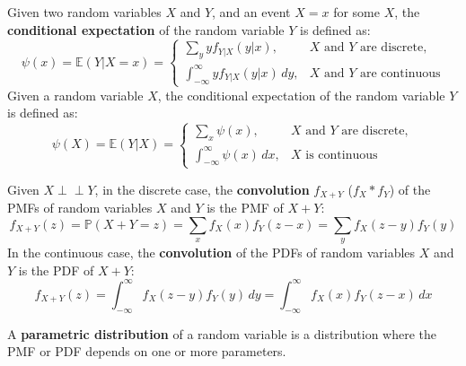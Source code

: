 \documentclass{huhtakm-template-book-v2}
\newcommand{\independent}{\perp\!\!\!\perp}
\newcommand{\prob}{\mathbb{P}}
\newcommand{\expect}{\mathbb{E}}
\begin{document}
    \begin{sdefn}
        Given two random variables $X$ and $Y$, and an event $X = x$ for some $X$, the \textbf{conditional expectation} of the random variable $Y$ is defined as:
        \begin{equation*}
            \psi(x) = \expect(Y | X = x) = \begin{cases}
                \sum_{y}yf_{Y|X}(y|x), & X \text{ and } Y \text{ are discrete},\\
                \int_{-\infty}^{\infty} yf_{Y|X}(y|x)\,dy, & X \text{ and } Y \text{ are continuous}
            \end{cases}
        \end{equation*}
        Given a random variable $X$, the conditional expectation of the random variable $Y$ is defined as:
        \begin{equation*}
            \psi(X) = \expect(Y | X) = \begin{cases}
                \sum_{x}\psi(x), & X \text{ and } Y \text{ are discrete},\\
                \int_{-\infty}^{\infty}\psi(x)\,dx, & X \text{ is continuous}
            \end{cases}
        \end{equation*}
    \end{sdefn}
    \begin{sdefn}
        Given $X \independent Y$, in the discrete case, the \textbf{convolution} $f_{X+Y}$ ($f_{X} * f_{Y}$) of the PMFs of random variables $X$ and $Y$ is the PMF of $X + Y$:
        \begin{equation*}
            f_{X+Y}(z) = \prob(X + Y = z) = \sum_{x}f_{X}(x)f_{Y}(z - x) = \sum_{y}f_{X}(z - y)f_{Y}(y)
        \end{equation*}
        In the continuous case, the \textbf{convolution} of the PDFs of random variables $X$ and $Y$ is the PDF of $X + Y$:
        \begin{equation*}
            f_{X+Y}(z) = \int_{-\infty}^{\infty} f_{X}(z - y)f_{Y}(y)\,dy = \int_{-\infty}^{\infty} f_{X}(x)f_{Y}(z - x)\,dx
        \end{equation*}
    \end{sdefn}
    \begin{sdefn}
        A \textbf{parametric distribution} of a random variable is a distribution where the PMF or PDF depends on one or more parameters.
    \end{sdefn}
    \newpage
\end{document}
